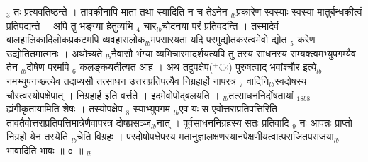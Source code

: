 \documentclass[article,12pt,a4paper]{memoir}%
\newcommand{\add}[1]{($^{+}$#1)}
\newcounter{parCount}
\begin{document}
{\tiny $_{3}$} तः प्रत्यवतिष्ठन्ते । तावकीनापि माता तथा स्यादिति न च तेऽनेन {\tiny $_{lb}$}प्रकारेण स्वस्याः स्वस्या मातुर्बन्धकीत्वं प्रतिपद्यन्ते । अपि तु भङ्ग्या हेतुव्यभि {\tiny $_{4}$} चार{\tiny $_{lb}$}चोदनया परं प्रतिवदन्ति । तस्मादेवं बालहालिकादिलोकप्रकटमपि व्यवहारालोक{\tiny $_{lb}$}मपसारयता यदि परमुद्योतकरत्वमेवो {\color{DodgerBlue3}द्योत {\tiny $_{5}$} करेण} उद्योतितमात्मनः । अथोच्यते {\tiny $_{lb}$}नैवासौ भंग्या व्यभिचारमादर्शयत्यपि तु तस्य साधनस्य सम्यक्त्वमभ्युपगम्यैव तेन {\tiny $_{lb}$}दोषेण परमपि {\tiny $_{6}$} कलङ्कयतीत्यत आह । {\color{DodgerBlue3}अथ तदुपक्षेप\add{ः} पुरुषत्वाद् भवांश्चौर} इत्ये{\tiny $_{lb}$}नमभ्युपगच्छत्येव तदाप्यसौ तत्साधन उत्तराप्रतिपत्यैव निग्रहार्हो नापरत्र {\tiny $_{7}$} वादिनि{\tiny $_{lb}$}स्वदोषस्य चौरत्वस्योपक्षेपात् । निग्रहार्ह इति वर्त्तते । इदमेवोपोद्बलयति । {\tiny $_{lb}$}तत्साधननिर्दोषतायां {\tiny $_{18b8}$} ह्यंगीकृतायामिति शेषः । तस्योपक्षेप {\tiny $_{8}$} स्याभ्युपगम {\tiny $_{lb}$}एव यः स एवोत्तराप्रतिपत्तिरिति तावतैवोत्तराप्रतिपत्तिमात्रेणैवापरत्र दोषप्रसञ्ज{\tiny $_{lb}$}नात् । पूर्वसाधननिग्रहस्य सतः प्रतिवादि {\tiny $_{9}$} \leavevmode{} नः आपन्नः प्राप्तो निग्रहो येन तस्येति {\tiny $_{lb}$}चेति विग्रहः । परदोषोपक्षेपस्य मतानुज्ञालक्षणस्यानपेक्षणीयत्वात्पराजितपराजया{\tiny $_{lb}$}भावादिति भावः ॥ ० ॥
	{}
	\pend%
      {\tiny $_{lb}$}
\end{document}
